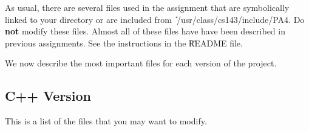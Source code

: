 \documentclass[11pt]{article}
\begin{document}

As usual, there are several files used in the assignment that are
symbolically linked to your directory or are included from \U{\
/usr/class/cs143/include/PA4}.  Do {\bf not} modify these files.  Almost all of
these files have have been described in previous assignments. See the
instructions in the \U{README} file.


We now describe the most important files for each
version of the project.

\subsection{C++ Version}

This is a list of the files that you may want to modify.
\end{document}

